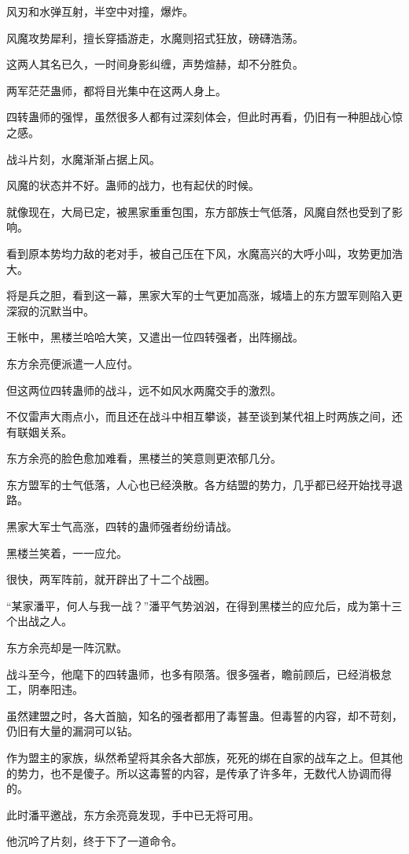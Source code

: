 \begin{this_body}
风刃和水弹互射，半空中对撞，爆炸。

风魔攻势犀利，擅长穿插游走，水魔则招式狂放，磅礴浩荡。

这两人其名已久，一时间身影纠缠，声势煊赫，却不分胜负。

两军茫茫蛊师，都将目光集中在这两人身上。

四转蛊师的强悍，虽然很多人都有过深刻体会，但此时再看，仍旧有一种胆战心惊之感。

战斗片刻，水魔渐渐占据上风。

风魔的状态并不好。蛊师的战力，也有起伏的时候。

就像现在，大局已定，被黑家重重包围，东方部族士气低落，风魔自然也受到了影响。

看到原本势均力敌的老对手，被自己压在下风，水魔高兴的大呼小叫，攻势更加浩大。

将是兵之胆，看到这一幕，黑家大军的士气更加高涨，城墙上的东方盟军则陷入更深寂的沉默当中。

王帐中，黑楼兰哈哈大笑，又遣出一位四转强者，出阵搦战。

东方余亮便派遣一人应付。

但这两位四转蛊师的战斗，远不如风水两魔交手的激烈。

不仅雷声大雨点小，而且还在战斗中相互攀谈，甚至谈到某代祖上时两族之间，还有联姻关系。

东方余亮的脸色愈加难看，黑楼兰的笑意则更浓郁几分。

东方盟军的士气低落，人心也已经涣散。各方结盟的势力，几乎都已经开始找寻退路。

黑家大军士气高涨，四转的蛊师强者纷纷请战。

黑楼兰笑着，一一应允。

很快，两军阵前，就开辟出了十二个战圈。

“某家潘平，何人与我一战？”潘平气势汹汹，在得到黑楼兰的应允后，成为第十三个出战之人。

东方余亮却是一阵沉默。

战斗至今，他麾下的四转蛊师，也多有陨落。很多强者，瞻前顾后，已经消极怠工，阴奉阳违。

虽然建盟之时，各大首脑，知名的强者都用了毒誓蛊。但毒誓的内容，却不苛刻，仍旧有大量的漏洞可以钻。

作为盟主的家族，纵然希望将其余各大部族，死死的绑在自家的战车之上。但其他的势力，也不是傻子。所以这毒誓的内容，是传承了许多年，无数代人协调而得的。

此时潘平邀战，东方余亮竟发现，手中已无将可用。

他沉吟了片刻，终于下了一道命令。


\end{this_body}

